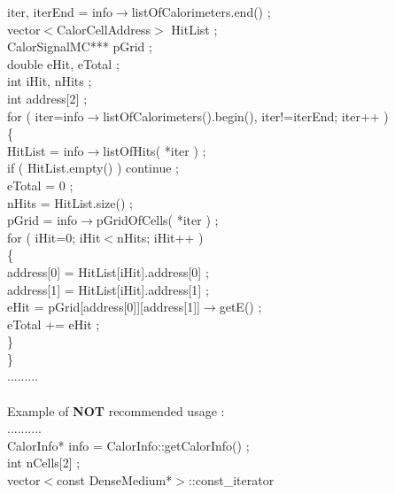       iter, iterEnd = info$\rightarrow$listOfCalorimeters.end() ; \\  
   vector$<$CalorCellAddress$>$ HitList ; \\
   CalorSignalMC*** pGrid ; \\
   double eHit, eTotal ; \\
   int iHit, nHits ; \\
   int address[2] ; \\
   for ( iter=info$\rightarrow$listOfCalorimeters().begin(), iter!=iterEnd; iter++ ) \\
   \{ \\
      HitList = info$\rightarrow$listOfHits( *iter ) ; \\
      if ( HitList.empty() ) continue ; \\
      eTotal = 0 ; \\
      nHits = HitList.size() ; \\
      pGrid = info$\rightarrow$pGridOfCells( *iter ) ; \\
      for ( iHit=0; iHit$<$nHits; iHit++ ) \\
      \{ \\
         address[0] = HitList[iHit].address[0] ; \\
	 address[1] = HitList[iHit].address[1] ; \\
	 eHit = pGrid[address[0]][address[1]]$\rightarrow$getE() ; \\ 
	 eTotal += eHit ;  \\ 
      \} \\
   \} \\
   ......... \\
   \\
   Example of {\bf NOT} recommended usage : \\
   .......... \\
   CalorInfo* info = CalorInfo::getCalorInfo() ; \\
   int nCells[2] ; \\
   vector$<$const DenseMedium*$>$::const\_iterator 
   
